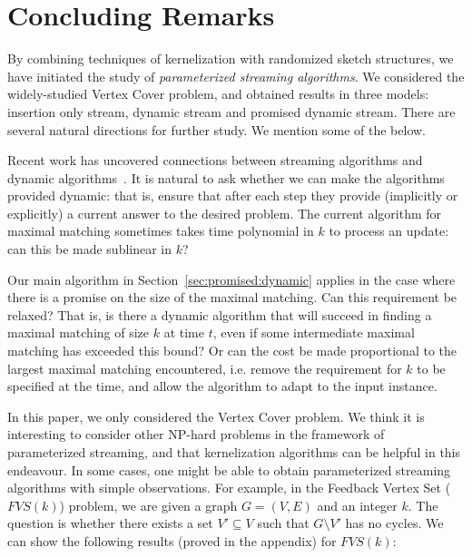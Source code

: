 \documentclass[11pt,letter]{article}
\renewcommand{\paragraph}[1]{\medskip \noindent {\bf #1}}
\begin{document}
\section{Concluding Remarks}

By combining techniques of kernelization with randomized sketch structures, we have initiated the study of \emph{parameterized streaming algorithms}. We considered the widely-studied Vertex Cover problem, and obtained results in three models: insertion only stream, dynamic stream and promised dynamic stream.
There are several natural directions for further study. We mention some of the below.

\paragraph{Dynamic Algorithms.} Recent work has uncovered connections between streaming algorithms and
dynamic algorithms~\cite{KKM13}.
It is natural to ask whether we can make the algorithms provided
dynamic: that is, ensure that after each step they provide (implicitly
or explicitly) a current answer to the desired problem.
The current algorithm for maximal matching sometimes takes time
polynomial in $k$ to process an update: can this be made sublinear in
$k$?

Our main algorithm in Section~\ref{sec:promised:dynamic} applies in the case where
there is a promise on the size of the maximal matching.
Can this requirement be relaxed?
That is, is there a dynamic algorithm that will succeed in finding a
maximal matching of size $k$ at time $t$, even if some intermediate
maximal matching has exceeded this bound?  Or can the cost be made
proportional to the largest maximal matching encountered, i.e. remove
the requirement for $k$ to be specified at the time, and allow the
algorithm to adapt to the input instance.

\paragraph{Other Problems.} In this paper, we only considered the
Vertex Cover problem. We think it is interesting to consider other
NP-hard problems in the framework of parameterized streaming, and that
kernelization algorithms can be helpful in this endeavour. In some
cases, one might be able to obtain parameterized streaming algorithms
with simple observations. For example, in the Feedback Vertex Set
($FVS(k)$) problem, we are given a graph $G=(V, E)$ and an integer
$k$. The question is whether there exists a set $V'\subseteq V$ such
that $G\setminus V'$ has no cycles.
We can show the following results (proved in the appendix)
for $FVS(k)$:
\end{document}
